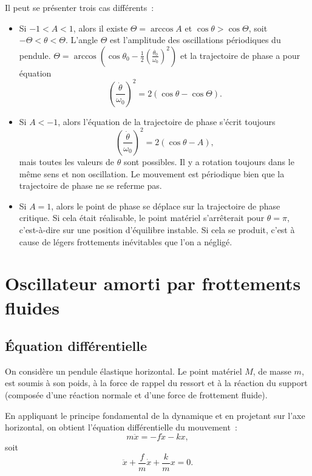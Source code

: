 Il peut se présenter trois cas différents~:
\begin{itemize}
\item Si $-1 < A < 1$, alors il existe $\Theta=\arccos A$ et $\cos\theta>\cos\Theta$, soit $-\Theta < \theta < \Theta$. L'angle $\Theta$ est l'amplitude des oscillations périodiques du pendule. $\Theta = \arccos\left(\cos\theta_0 - \frac{1}{2}\left(\frac{\dot{\theta_0}}{\omega_0}\right)^2\right)$ et la trajectoire de phase a pour équation
  \begin{equation}
    \left(\frac{\dot{\theta}}{\omega_0}\right)^2 = 2(\cos\theta - \cos\Theta).
  \end{equation}
\item Si $A < -1$, alors l'équation de la trajectoire de phase s'écrit toujours 
  \begin{equation}
    \left(\frac{\dot{\theta}}{\omega_0}\right)^2 = 2(\cos\theta - A),
  \end{equation}
  mais toutes les valeurs de $\theta$ sont possibles. Il y a rotation toujours dans le même sens et non oscillation. Le mouvement est périodique bien que la trajectoire de phase ne se referme pas.
\item Si $A = 1$, alors le point de phase se déplace sur la trajectoire de phase critique. Si cela était réalisable, le point matériel s'arrêterait pour $\theta=\pi$, c'est-à-dire sur une position d'équilibre instable. Si cela se produit, c'est à cause de légers frottements inévitables que l'on a négligé.
\end{itemize}

\section{Oscillateur amorti par frottements fluides}
\label{chap5-sec:oscillateuramorti}

\subsection{Équation différentielle}
\label{chap5-subsec:equadiffoscillateuramorti}

On considère un pendule élastique horizontal. Le point matériel $M$, de masse $m$, est soumis à son poids, à la force de rappel du ressort et à la réaction du support (composée d'une réaction normale et d'une force de frottement fluide).

En appliquant le principe fondamental de la dynamique et en projetant sur l'axe horizontal, on obtient l'équation différentielle du mouvement~:
\begin{equation}
  m\ddot x = -f\dot x -kx,
\end{equation}
soit
\begin{equation}
  \ddot x + \frac{f}{m} \dot x +\frac{k}{m}x = 0.
\end{equation}

